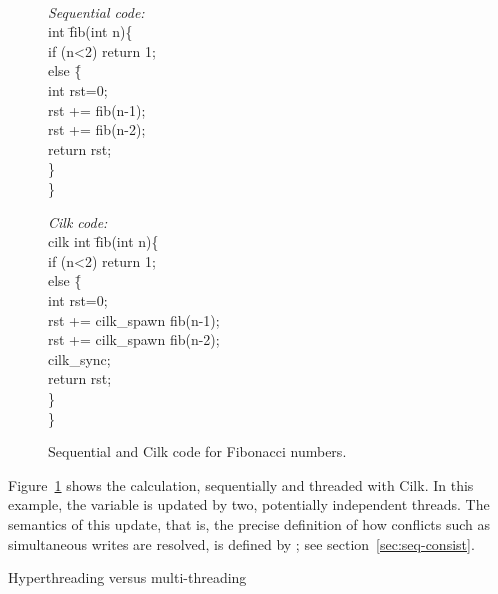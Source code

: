 \begin{figure}[ht]
  \begin{multicols}{2}
    \tt
    \begin{tabbing}
      \textit{Sequential code:}\\  
      int \=fib(int n)\{ \\
      \>if (n<2) return 1;\\
      \>else \=\{\\
      \>\>int rst=0;\\
      \>\>rst += fib(n-1);\\
      \>\>rst += fib(n-2);\\
      \>\>return rst;\\
      \>\>\}\\
      \}\\
    \end{tabbing}
    \columnbreak    
    \begin{tabbing}
      \textit{Cilk code:}\\  
      cilk int \=fib(int n)\{ \\
      \>if (n<2) return 1;\\
      \>else \=\{\\
      \>\>int rst=0;\\
      \>\>rst += cilk\_spawn fib(n-1);\\
      \>\>rst += cilk\_spawn fib(n-2);\\
      \>\>cilk\_sync;\\
      \>\>return rst;\\
      \>\>\}\\
      \}\\
    \end{tabbing}
  \end{multicols}
  \caption{Sequential and Cilk code for Fibonacci numbers.}
  \label{fig:cilk-code}
\end{figure}

Figure~\ref{fig:cilk-code} shows the 
calculation, sequentially and threaded with Cilk.
In this example, the variable  is updated by two, potentially
independent threads. The semantics of this update, that is, the
precise definition of how conflicts such as simultaneous writes are
resolved, is defined by ; see
section~\ref{sec:seq-consist}.

 {Hyperthreading versus multi-threading}
\label{sec:hyperthread}

